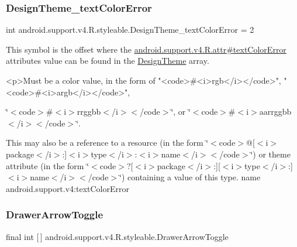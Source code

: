 \subsubsection{\texorpdfstring{Design\+Theme\+\_\+text\+Color\+Error}{DesignTheme\_textColorError}}
{\footnotesize\ttfamily int android.\+support.\+v4.\+R.\+styleable.\+Design\+Theme\+\_\+text\+Color\+Error = 2\hspace{0.3cm}{\ttfamily [static]}}

This symbol is the offset where the \hyperlink{classandroid_1_1support_1_1v4_1_1R_1_1attr_aef1b465301aac63a751d46963c485c84}{android.\+support.\+v4.\+R.\+attr\#text\+Color\+Error} attribute\textquotesingle{}s value can be found in the \hyperlink{classandroid_1_1support_1_1v4_1_1R_1_1styleable_ac24c90108ad2b0d7b729f30efc3f8de9}{Design\+Theme} array.

\begin{DoxyVerb}      <p>Must be a color value, in the form of "<code>#<i>rgb</i></code>", "<code>#<i>argb</i></code>",
\end{DoxyVerb}
 \char`\"{}$<$code$>$\#$<$i$>$rrggbb$<$/i$>$$<$/code$>$\char`\"{}, or \char`\"{}$<$code$>$\#$<$i$>$aarrggbb$<$/i$>$$<$/code$>$\char`\"{}. 

This may also be a reference to a resource (in the form \char`\"{}$<$code$>$@\mbox{[}$<$i$>$package$<$/i$>$\+:\mbox{]}$<$i$>$type$<$/i$>$\+:$<$i$>$name$<$/i$>$$<$/code$>$\char`\"{}) or theme attribute (in the form \char`\"{}$<$code$>$?\mbox{[}$<$i$>$package$<$/i$>$\+:\mbox{]}\mbox{[}$<$i$>$type$<$/i$>$\+:\mbox{]}$<$i$>$name$<$/i$>$$<$/code$>$\char`\"{}) containing a value of this type.  name android.\+support.\+v4\+:text\+Color\+Error \mbox{\label{classandroid_1_1support_1_1v4_1_1R_1_1styleable_af08d693b5d7faf0f18822ffe29c6028c}} 
\subsubsection{\texorpdfstring{Drawer\+Arrow\+Toggle}{DrawerArrowToggle}}
{\footnotesize\ttfamily final int \mbox{[}$\,$\mbox{]} android.\+support.\+v4.\+R.\+styleable.\+Drawer\+Arrow\+Toggle\hspace{0.3cm}{\ttfamily [static]}}

